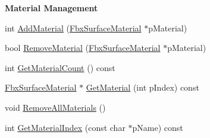 \begin{Indent}\textbf{ Material Management}\par
\begin{DoxyCompactItemize}
\item 
int \hyperlink{class_fbx_node_a6f28c5ed116319e03d31a21e897b6dad}{Add\+Material} (\hyperlink{class_fbx_surface_material}{Fbx\+Surface\+Material} $\ast$p\+Material)
\item 
bool \hyperlink{class_fbx_node_a9c02b146acb71731466cc55306c30d60}{Remove\+Material} (\hyperlink{class_fbx_surface_material}{Fbx\+Surface\+Material} $\ast$p\+Material)
\item 
int \hyperlink{class_fbx_node_a00fabc04c839f665fa5d4a0b49859745}{Get\+Material\+Count} () const
\item 
\hyperlink{class_fbx_surface_material}{Fbx\+Surface\+Material} $\ast$ \hyperlink{class_fbx_node_aa89bfed69b0fe26ee03708931fbda9c2}{Get\+Material} (int p\+Index) const
\item 
void \hyperlink{class_fbx_node_ac3caa3dc577a5b6fe125ed547d2dbd9d}{Remove\+All\+Materials} ()
\item 
int \hyperlink{class_fbx_node_a9648447be5910defe6769a37f8610778}{Get\+Material\+Index} (const char $\ast$p\+Name) const
\end{DoxyCompactItemize}
\end{Indent}
